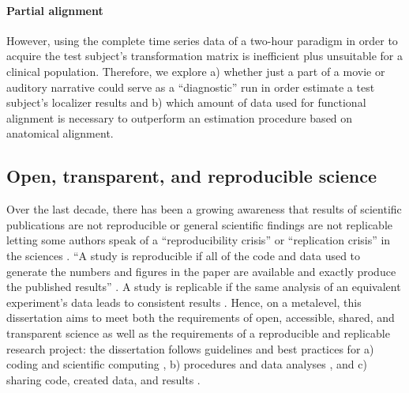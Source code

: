 \paragraph{Partial alignment}
However, using the complete time series data of a two-hour paradigm in order to
acquire the test subject's transformation matrix is inefficient plus unsuitable
for a clinical population.
%
Therefore, we explore a) whether just a part of a movie or auditory narrative
could serve as a ``diagnostic'' run in order estimate a test
subject's localizer results and b)  which amount of data used for functional
alignment is necessary to outperform an estimation procedure based on anatomical
alignment.


\subsection{Open, transparent, and reproducible science}

Over the last decade, there has been a growing awareness that results of
scientific publications are not reproducible or general scientific findings are
not replicable letting some authors speak of a ``reproducibility crisis'' or
``replication crisis'' in the sciences \citep{baker2016reproducibility,
plesser2018reproducibility, stupple2019reproducibility, nosek2022replicability}.
``A study is reproducible if all of the code and data used to generate the
numbers and figures in the paper are available and exactly produce the published
results'' \citep{leek2017most}.
A study is replicable if the same analysis of an equivalent experiment's data
leads to consistent results \citep{dubois2016building, leek2017most}.
%
Hence, on a metalevel, this dissertation aims to meet both the requirements of
open, accessible, shared, and transparent science \citep{watson2015will,
fecher2014open} as well as the requirements of a reproducible and replicable
research project:
%
the dissertation follows guidelines and best practices for a) coding and
scientific computing \citep{wilson2014best}, b) procedures and data analyses
\citep{nichols2017best, poldrack2017scanning, poldrack2019establishment}, and c)
sharing code, created data, and results \citep{eglen2017toward, nichols2017best,
pernet2015improving}.



